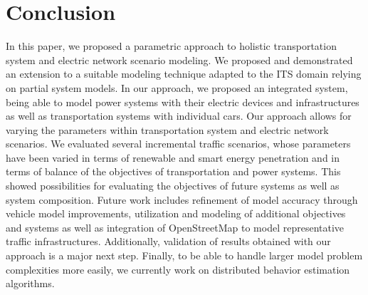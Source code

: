\section{Conclusion}
\label{section:conclusion}

In this paper, we proposed a parametric approach to holistic transportation system and electric network scenario modeling. We proposed and demonstrated an extension to a suitable modeling technique adapted to the ITS domain relying on partial system models. 
In our approach, we proposed an integrated system, being able to model power systems with their electric devices and infrastructures as well as transportation systems with individual cars. Our approach allows for varying the parameters within transportation system and electric network scenarios. We evaluated several incremental traffic scenarios, whose parameters have been varied in terms of renewable and smart energy penetration and in terms of balance of the objectives of transportation and power systems. 
This showed possibilities for evaluating the objectives of future systems as well as system composition. Future work includes refinement of model accuracy through vehicle model improvements, utilization and modeling of additional objectives and systems as well as integration of OpenStreetMap to model representative traffic infrastructures. Additionally, validation of results obtained with our approach is a major next step. Finally, to be able to handle larger model problem complexities more easily, we currently work on distributed behavior estimation algorithms.

